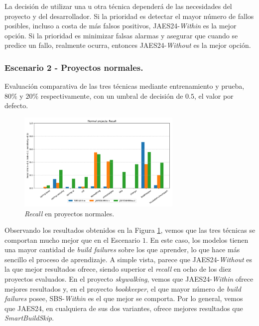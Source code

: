 La decisión de utilizar una u otra técnica dependerá de las necesidades del proyecto y del
desarrollador. Si la prioridad es detectar el mayor número de fallos posibles, incluso a costa de
más falsos positivos, JAES24-\textit{Within} es la mejor opción. Si la prioridad es minimizar
falsas alarmas y asegurar que cuando se predice un fallo, realmente ocurra, entonces
JAES24-\textit{Without} es la mejor opción.\\


\subsubsection{Escenario 2 - Proyectos normales.} Evaluación comparativa de las tres técnicas
mediante entrenamiento y prueba, $80\%$ y $20\%$ respectivamente, con un umbral de decisión
de $0.5$, el valor por defecto.

\begin{figure}[H]
    \centering
    \includegraphics[width=0.7\textwidth]{images/Normal projects: Recall.pdf}
    \caption{\textit{Recall} en proyectos normales.}
    \label{fig:train_test_recall_normal_projects}
\end{figure}

Observando los resultados obtenidos en la Figura \ref{fig:train_test_recall_normal_projects},
vemos que las tres técnicas se comportan mucho mejor que en el Escenario $1$. En este caso,
los modelos tienen una mayor cantidad de \textit{build failures} sobre los que aprender, lo que
hace más sencillo el proceso de aprendizaje. A simple vista, parece que JAES24-\textit{Without}
es la que mejor resultados ofrece, siendo superior el \textit{recall} en ocho de los diez
proyectos evaluados. En el proyecto \textit{skywalking}, vemos que JAES24-\textit{Within} ofrece
mejores resultados y, en el proyecto \textit{bookkeeper}, el que mayor número de \textit{build
failures} posee, SBS-\textit{Within} es el que mejor se comporta. Por lo general, vemos que
JAES24, en cualquiera de sus dos variantes, ofrece mejores resultados que
\textit{SmartBuildSkip}.

